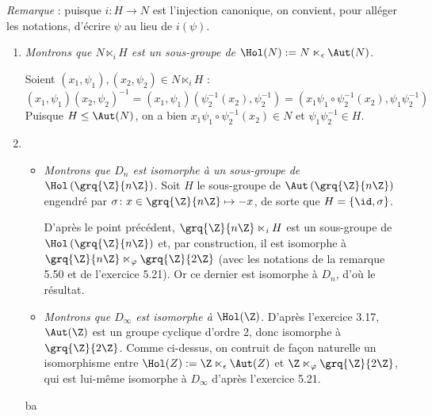 \emph{Remarque} : puisque $i\colon H\to N$ est l'injection canonique, on convient, pour alléger les notations, d'écrire $\psi$ au lieu de $i(\psi)$.

\begin{enumerate}
 \item \emph{Montrons que $N\ltimes_i H$ est un sous-groupe de $\Hol(N):= N \ltimes_{\epsilon} \Aut(N)$}.

 Soient $(x_1,\psi_1), (x_2,\psi_2) \in N\ltimes_i H$ :
 \[ (x_1,\psi_1)(x_2,\psi_2)^{-1} =   (x_1,\psi_1)(\psi_2^{-1}(x_2),\psi_2^{-1}) = (x_1 \psi_1\circ \psi_2^{-1}(x_2), \psi_1\psi_2^{-1})\]
 Puisque $H\leq \Aut(N)$, on a bien $x_1 \psi_1\circ \psi_2^{-1}(x_2) \in N$ et $\psi_1\psi_2^{-1}\in H$.

 \item
 \begin{itemize}\itemsep 0.1cm
  \item  \emph{Montrons que $D_n$ est isomorphe à un sous-groupe de $\Hol\left(\grq{\Z}{n\Z} \right)$}. Soit $H$ le sous-groupe de $\Aut\left(\grq{\Z}{n\Z} \right)$ engendré par $\sigma\colon x\in \grq{\Z}{n\Z}\mapsto -x$, de sorte que $H=\{\id, \sigma \}$.

 D'après le point précédent, $\grq{\Z}{n\Z}\ltimes_i H$ est un sous-groupe de $\Hol\left(\grq{\Z}{n\Z} \right)$ et, par construction, il est isomorphe à $\grq{\Z}{n\Z}\ltimes_{\varphi} \grq{\Z}{2\Z}$ (avec les notations de la remarque 5.50 et de l'exercice 5.21). Or ce dernier est isomorphe à $D_n$, d'où le résultat.

 \item \emph{Montrons que $D_{\infty}$ est isomorphe à $\Hol(\Z)$}. D'après l'exercice 3.17, $\Aut(\Z)$ est un groupe cyclique d'ordre 2, donc isomorphe à $\grq{\Z}{2\Z}$. Comme ci-dessus, on contruit de façon naturelle un isomorphisme entre $\Hol(Z):= \Z \ltimes_{\epsilon} \Aut(Z)$ et $\Z \ltimes_{\varphi} \grq{\Z}{2\Z}$, qui est lui-même isomorphe à $D_{\infty}$ d'après l'exercice 5.21.
 \end{itemize}

ba


\end{enumerate}




